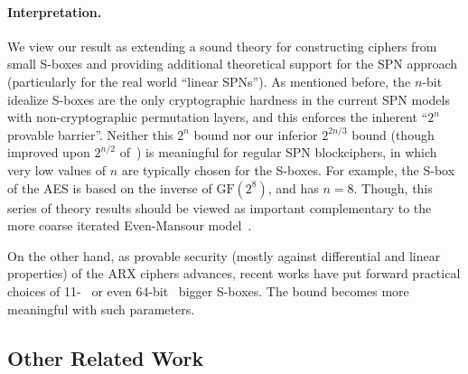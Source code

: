 \paragraph{Interpretation.}

We view our result as extending a sound theory for constructing ciphers from small S-boxes and providing additional theoretical support for the SPN approach (particularly for the real world ``linear SPNs''). As mentioned before, the $n$-bit idealize S-boxes are the only cryptographic hardness in the current SPN models with non-cryptographic permutation layers, and this enforces the inherent ``$2^n$ provable barrier''. Neither this $2^n$ bound nor our inferior $2^{2n/3}$ bound (though improved upon $2^{n/2}$ of~\cite{C:CDKLST18}) is meaningful for regular SPN blockciphers, in which very low values of $n$ are typically chosen for the S-boxes. For example, the S-box of the AES is based on the inverse of $\text{GF}(2^8)$, and has $n=8$.
Though, this series of theory results should be viewed as important complementary to the more coarse iterated Even-Mansour model~\cite{EC:BKLSST12}.

On the other hand, as provable security (mostly against differential and linear properties) of the ARX ciphers advances, recent works have put forward practical choices of 11-~\cite{DBLP:journals/tosc/16-bit-Sbox} or even 64-bit~\cite{cryptoeprint:2019:1378} bigger S-boxes. The bound becomes more meaningful with such parameters.




\subsection{Other Related Work}


